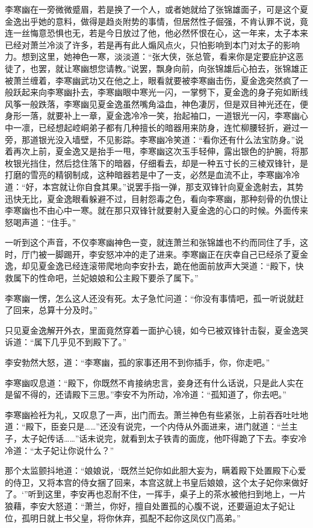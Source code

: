 李寒幽在一旁微微蹙眉，若是换了一个人，或者她就给了张锦雄面子，可是这个夏金逸出乎她的意料，做得是趋炎附势的事情，但居然性子倔强，不肯认罪不说，竟连一丝悔意恐惧也无，若是今日放过了他，他必然怀恨在心，这一年来，太子本来已经对萧兰冷淡了许多，若是再有此人煽风点火，只怕影响到本门对太子的影响力。想到这里，她神色一寒，淡淡道：“张大侠，张总管，看来你是定要庇护这恶徒了，也罢，就让寒幽想您请教。”说罢，飘身向前，向张锦雄后心拍去，张锦雄正被萧兰缠着，李寒幽武功又在他之上，眼看就要被李寒幽击伤，夏金逸突然疯了一般跃起来向李寒幽扑去，李寒幽眼中寒光一闪，一掌劈下，夏金逸的身子宛如断线风筝一般跌落，李寒幽见夏金逸虽然嘴角溢血，神色凄厉，但是双目神光还在，便身形一落，就要补上一章，夏金逸冷冷一笑，抬起袖口，一道银光一闪，李寒幽心中一凛，已经想起崆峒弟子都有几种擅长的暗器用来防身，连忙柳腰轻折，避过一旁，那道银光没入墙壁，不见影踪。李寒幽冷笑道：“看你还有什么法宝防身。”说着再次上前，夏金逸又是抬手一甩，李寒幽这次玉手轻伸，露出银色的护腕，将那枚银光挡住，然后捻住落下的暗器，仔细看去，却是一种五寸长的三棱双锋针，是打磨的雪亮的精钢制成，这种暗器若是中了一支，必然是血流不止，李寒幽冷冷道：“好，本宫就让你自食其果。”说罢手指一弹，那支双锋针向夏金逸射去，其势迅快无比，夏金逸眼看躲避不过，目射怨毒之色，看向李寒幽，那种刻骨的仇恨让李寒幽也不由心中一寒。就在那只双锋针就要射入夏金逸的心口的时候。外面传来怒喝声道：“住手。”

一听到这个声音，不仅李寒幽神色一变，就连萧兰和张锦雄也不约而同住了手，这时，厅门被一脚踢开，李安怒冲冲的走了进来。李寒幽正在庆幸自己已经杀了夏金逸，却见夏金逸已经连滚带爬地向李安扑去，跪在他面前放声大哭道：“殿下，快救属下的性命吧，兰妃娘娘和公主殿下要杀了属下。”

李寒幽一愣，怎么这人还没有死。太子急忙问道：“你没有事情吧，孤一听说就赶了回来，总算十分及时。”

只见夏金逸解开外衣，里面竟然穿着一面护心镜，如今已被双锋针击裂，夏金逸哭诉道：“属下几乎见不到殿下了。”

李安勃然大怒，道：“李寒幽，孤的家事还用不到你插手，你，你走吧。”

李寒幽叹息道：“殿下，你既然不肯接纳忠言，妾身还有什么话说，只是此人实在是留不得的，还请殿下三思。”李安不为所动，冷冷道：“孤知道了，你去吧。”

李寒幽裣衽为礼，又叹息了一声，出门而去。萧兰神色有些紧张，上前吞吞吐吐地道：“殿下，臣妾只是……”还没有说完，一个内侍从外面进来，进门就道：“兰主子，太子妃传话……”话未说完，就看到太子铁青的面庞，他吓得跪了下去。李安冷冷道：“太子妃让你说什么？”

那个太监颤抖地道：“娘娘说，‘既然兰妃你如此胆大妄为，瞒着殿下处置殿下心爱的侍卫，又将本宫的侍女捆了回来，本宫这就上书皇后娘娘，这个太子妃你来做好了。‘”听到这里，李安再也忍耐不住，一挥手，桌子上的茶水被他扫到地上，一片狼藉，李安大怒道：“萧兰，你好，擅自处置孤的心腹不说，还要逼迫太子妃让位，孤明日就上书父皇，将你休弃，孤配不起你这凤仪门高弟。”

